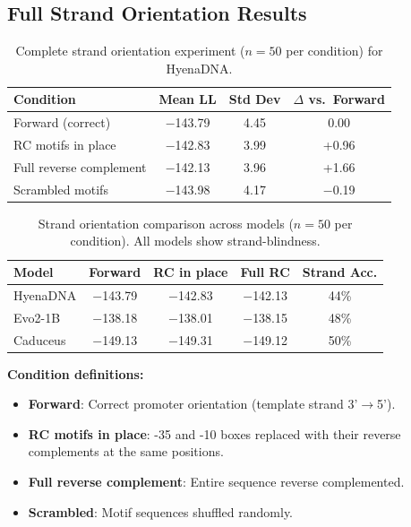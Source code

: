 \documentclass{article}
\begin{document}
\subsection{Full Strand Orientation Results}

\begin{table}[H]
\caption{Complete strand orientation experiment ($n=50$ per condition) for HyenaDNA.}
\label{tab:full_strand}
\begin{center}
\small
\begin{tabular}{lccc}
\toprule
Condition & Mean LL & Std Dev & $\Delta$ vs.\ Forward \\
\midrule
Forward (correct) & $-$143.79 & 4.45 & 0.00 \\
RC motifs in place & $-$142.83 & 3.99 & +0.96 \\
Full reverse complement & $-$142.13 & 3.96 & +1.66 \\
Scrambled motifs & $-$143.98 & 4.17 & $-$0.19 \\
\bottomrule
\end{tabular}
\end{center}
\end{table}

\begin{table}[H]
\caption{Strand orientation comparison across models ($n=50$ per condition). All models show strand-blindness.}
\label{tab:strand_all_models}
\begin{center}
\small
\begin{tabular}{lcccc}
\toprule
Model & Forward & RC in place & Full RC & Strand Acc. \\
\midrule
HyenaDNA & $-$143.79 & $-$142.83 & $-$142.13 & 44\% \\
Evo2-1B & $-$138.18 & $-$138.01 & $-$138.15 & 48\% \\
Caduceus & $-$149.13 & $-$149.31 & $-$149.12 & 50\% \\
\bottomrule
\end{tabular}
\end{center}
\end{table}

\textbf{Condition definitions:}
\begin{itemize}
\item \textbf{Forward}: Correct promoter orientation (template strand 3'$\rightarrow$5').
\item \textbf{RC motifs in place}: -35 and -10 boxes replaced with their reverse complements at the same positions.
\item \textbf{Full reverse complement}: Entire sequence reverse complemented.
\item \textbf{Scrambled}: Motif sequences shuffled randomly.
\end{itemize}
\end{document}
